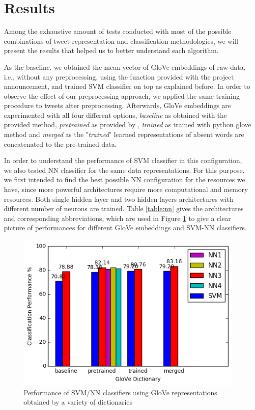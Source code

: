 \section{Results}
\label{sec:results}
Among the exhaustive amount of tests conducted with most of the possible combinations of tweet representation and classification methodologies, we will present the results that helped us to better understand each algorithm.

As the baseline, we obtained the mean vector of GloVe embeddings of raw data, i.e., without any preprocessing, using the function provided with the project announcement, and trained SVM classifier on top as explained before.
In order to observe the effect of our preprocessing approach, we applied the same training procedure to tweets after preprocessing.
Afterwards, GloVe embeddings are experimented with all four different options, \textit{baseline} as obtained with the provided method, \textit{pretrained} as provided by \cite{pennington2014glove}, \textit{trained} as trained with python glove method and \textit{merged} as the "\textit{trained}" learned representations of absent words are concatenated to the pre-trained data.

In order to understand the performance of SVM classifier in this configuration, we also tested NN classifier for the same data representations.
For this purpose, we first intended to find the best possible NN configuration for the resources we have, since more powerful architectures require more computational and memory resources.
Both single hidden layer and two hidden layers architectures with different number of neurons are trained.
Table \ref{table:nn} gives the architectures and corresponding abbreviations, which are used in Figure \ref{fig:perf1} to give a clear picture of performances for different GloVe embeddings and SVM-NN classifiers.



\begin{figure}[h!]
	\centering
	\includegraphics[width=0.8\columnwidth]{glove_NN_SVM.png}
	\caption{Performance of SVM/NN classifiers using GloVe representations obtained by a variety of dictionaries}
	\label{fig:perf1}
\end{figure}

